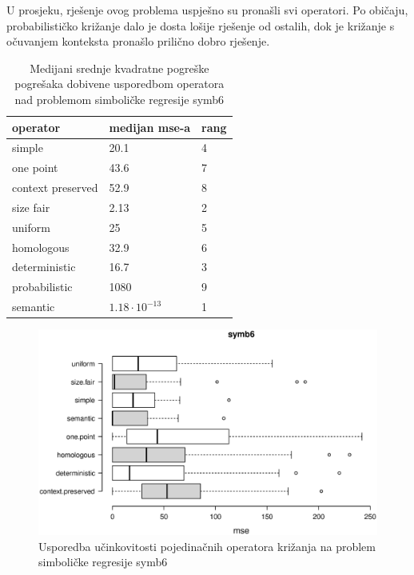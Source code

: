 U prosjeku, rješenje ovog problema uspješno su pronašli svi operatori. Po običaju, probabilističko križanje dalo je dosta lošije rješenje od ostalih, dok je križanje s očuvanjem konteksta pronašlo prilično dobro rješenje. 

\begin{table}[H]
 	\centering
    \caption{Medijani srednje kvadratne pogreške pogrešaka dobivene usporedbom operatora nad problemom simboličke regresije symb6}
    
    \begin{tabular}{| l | l | l |}
    \hline
    \textbf{operator} & \textbf{medijan mse-a} & \textbf{rang}\\ \hline
    simple & 20.1 & 4\\ \hline
    one point & 43.6 & 7\\ \hline
    context preserved & 52.9 & 8\\ \hline
    size fair & 2.13 & 2\\ \hline
    uniform & 25 & 5\\ \hline
    homologous & 32.9 & 6\\ \hline
    deterministic & 16.7 & 3\\ \hline
    probabilistic & 1080 & 9\\ \hline
    semantic & $1.18 \cdot 10^{-13}$ & 1\\ \hline
    \end{tabular}
    

    \label{symb6table}
\end{table}

\begin{figure}[H]
	\centering
	\includegraphics[trim=0cm 4cm 0cm 0cm, scale=0.5]{./slike/boxPlots/symb6.eps}
	\caption{Usporedba učinkovitosti pojedinačnih operatora križanja na problem simboličke regresije symb6}
	\label{symb6box}
\end{figure}



